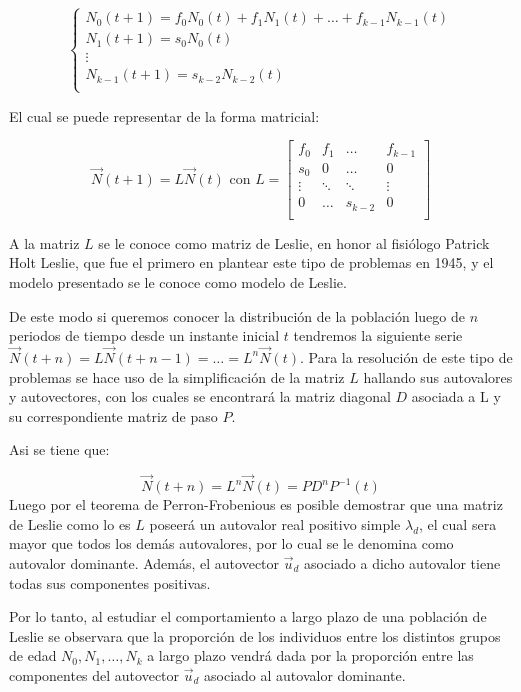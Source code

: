\[
  \begin{cases}
    N_{0}(t+1) = f_{0}N_{0}(t) +  f_{1}N_{1}(t) + \dots + f_{k-1}N_{k-1}(t)\\
    N_{1}(t+1) = s_{0}N_{0}(t)\\
		\vdots\\
		N_{k-1}(t+1) = s_{k-2}N_{k-2}(t)\\
	\end{cases}
\]

El cual se puede representar de la forma matricial:

\[
  \vec{N}(t+1) = L \vec{N}(t) \text{ con } L = 
\left[\begin{array}{cccc}
		f_{0}& f_{1}& \dots & f_{k-1}\\
		s_{0}& 0 & \dots & 0\\
		\vdots & \ddots & \ddots & \vdots\\
		0 & \dots & s_{k-2} & 0\\
\end{array}\right]
\]

A la matriz $L$ se le conoce como matriz de Leslie, en honor al fisiólogo Patrick Holt Leslie, que fue el primero en plantear este tipo de problemas en 1945, y el modelo presentado se le conoce como modelo de Leslie.


De este modo si queremos conocer la distribución de la población luego de $n$ periodos de tiempo desde un instante inicial $t$ tendremos la siguiente serie $\vec{N}(t+n) = L\vec{N}(t+n-1) = \dots = L^{n}\vec{N}(t) $. Para la resolución de este tipo de problemas se hace uso de la simplificación de la matriz $L$ hallando sus autovalores y autovectores, con los cuales se encontrará la matriz diagonal $D$ asociada a L y su correspondiente matriz de paso $P$.

Asi se tiene que:

\[
  \vec{N}(t+n) = L^{n}\vec{N}(t) = PD^{n}P^{-1}(t)
\]
Luego por el teorema de Perron-Frobenious es posible demostrar que una matriz de Leslie como lo es  $L$ poseerá un autovalor real positivo simple $\lambda_d$, el cual sera mayor que todos los demás autovalores, por lo cual se le denomina como autovalor dominante. Además, el autovector $\vec{u}_d$ asociado a dicho autovalor tiene todas sus componentes positivas.

Por lo tanto, al estudiar el comportamiento a largo plazo de una población de Leslie se observara que la proporción de los individuos entre los distintos grupos de edad $N_0,N_1,\dots,N_k$ a largo plazo vendrá dada por la proporción entre las componentes del autovector $\vec{u}_d$ asociado al autovalor dominante.

